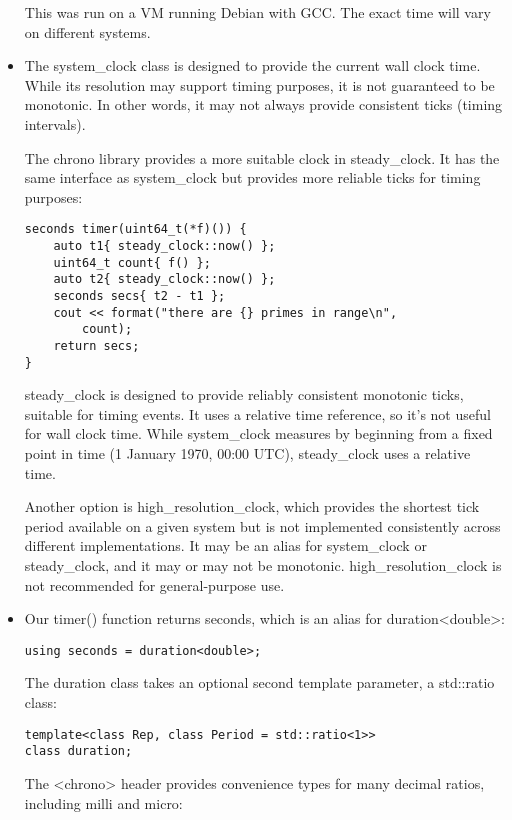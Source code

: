 \begin{itemize}
This was run on a VM running Debian with GCC. The exact time will vary on different systems.

\item 
The system\_clock class is designed to provide the current wall clock time. While its resolution may support timing purposes, it is not guaranteed to be monotonic. In other words, it may not always provide consistent ticks (timing intervals).

The chrono library provides a more suitable clock in steady\_clock. It has the same interface as system\_clock but provides more reliable ticks for timing purposes:

\begin{lstlisting}[style=styleCXX]
seconds timer(uint64_t(*f)()) {
	auto t1{ steady_clock::now() };
	uint64_t count{ f() };
	auto t2{ steady_clock::now() };
	seconds secs{ t2 - t1 };
	cout << format("there are {} primes in range\n",
		count);
	return secs;
}
\end{lstlisting}

steady\_clock is designed to provide reliably consistent monotonic ticks, suitable for timing events. It uses a relative time reference, so it's not useful for wall clock time. While system\_clock measures by beginning from a fixed point in time (1 January 1970, 00:00 UTC), steady\_clock uses a relative time.

Another option is high\_resolution\_clock, which provides the shortest tick period available on a given system but is not implemented consistently across different implementations. It may be an alias for system\_clock or steady\_clock, and it may or may not be monotonic. high\_resolution\_clock is not recommended for general-purpose use.

\item 
Our timer() function returns seconds, which is an alias for duration<double>:

\begin{lstlisting}[style=styleCXX]
using seconds = duration<double>;
\end{lstlisting}

The duration class takes an optional second template parameter, a std::ratio class:

\begin{lstlisting}[style=styleCXX]
template<class Rep, class Period = std::ratio<1>>
class duration;
\end{lstlisting}

The <chrono> header provides convenience types for many decimal ratios, including milli and micro:


\end{itemize}
